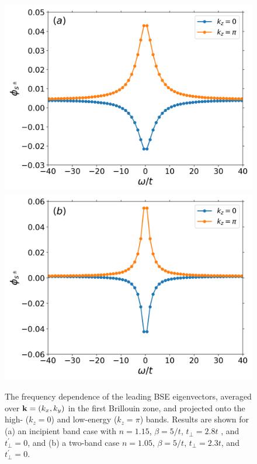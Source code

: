 \documentclass[prb,twocolumn,amsmath,amssymb,superscriptaddress,floatfix,nofootinbib]{revtex4-2}
\begin{document}
\begin{figure}[t]
\centering
\includegraphics[scale=0.4]{kaveraged_eig_U6_tp2pt8_tpp0_bt5_n0pt85.png}
\includegraphics[scale=0.4]{kaveraged_Eig_U6_tp2pt3_tpp0_bt5_n0pt95.png}
\caption{The frequency dependence of the leading BSE eigenvectors, averaged over ${\bf k} = (k_x,k_y)$ in the first Brillouin zone, and projected onto the high- ($k_z = 0$) and low-energy ($k_z = \pi$) bands. Results are shown for (a) an incipient band case with $n=1.15$, $\beta=5/t$, $t_{\perp}=2.8t$ , and $t_\perp^\prime = 0$, and (b) a two-band case $n=1.05$, $\beta=5/t$, $t_{\perp}=2.3t$, and $t_\perp^\prime = 0$.}
\label{fig:kavEig}
\end{figure}
\end{document}
